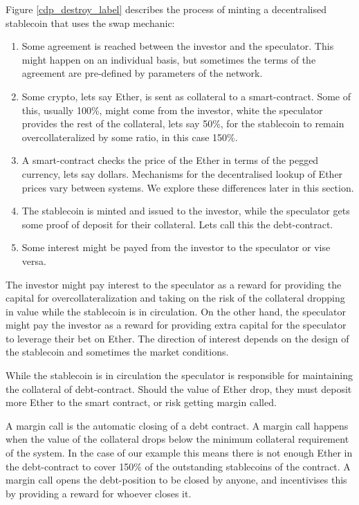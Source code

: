 \documentclass[english,]{IEEEtran}
\providecommand{\tightlist}{%
  \setlength{\itemsep}{0pt}\setlength{\parskip}{0pt}}
\begin{document}
Figure \ref{cdp_destroy_label} describes the process of minting a
decentralised stablecoin that uses the swap mechanic:

\begin{enumerate}
\def\labelenumi{\arabic{enumi}.}
\setcounter{enumi}{-1}
\tightlist
\item
  Some agreement is reached between the investor and the speculator.
  This might happen on an individual basis, but sometimes the terms of
  the agreement are pre-defined by parameters of the network.
\item
  Some crypto, lets say Ether, is sent as collateral to a
  smart-contract. Some of this, usually 100\%, might come from the
  investor, white the speculator provides the rest of the collateral,
  lets say 50\%, for the stablecoin to remain overcollateralized by some
  ratio, in this case 150\%.
\item
  A smart-contract checks the price of the Ether in terms of the pegged
  currency, lets say dollars. Mechanisms for the decentralised lookup of
  Ether prices vary between systems. We explore these differences later
  in this section.
\item
  The stablecoin is minted and issued to the investor, while the
  speculator gets some proof of deposit for their collateral. Lets call
  this the debt-contract.
\item
  Some interest might be payed from the investor to the speculator or
  vise versa.
\end{enumerate}

The investor might pay interest to the speculator as a reward for
providing the capital for overcollateralization and taking on the risk
of the collateral dropping in value while the stablecoin is in
circulation. On the other hand, the speculator might pay the investor as
a reward for providing extra capital for the speculator to leverage
their bet on Ether. The direction of interest depends on the design of
the stablecoin and sometimes the market conditions.

While the stablecoin is in circulation the speculator is responsible for
maintaining the collateral of debt-contract. Should the value of Ether
drop, they must deposit more Ether to the smart contract, or risk
getting margin called.

A margin call is the automatic closing of a debt contract. A margin call
happens when the value of the collateral drops below the minimum
collateral requirement of the system. In the case of our example this
means there is not enough Ether in the debt-contract to cover 150\% of
the outstanding stablecoins of the contract. A margin call opens the
debt-position to be closed by anyone, and incentivises this by providing
a reward for whoever closes it.
\end{document}
